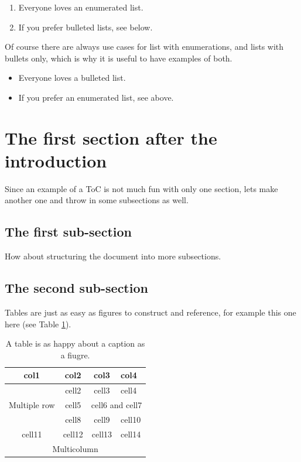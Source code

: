 \documentclass{smarthepnote}
\begin{document}
\begin{enumerate}
\item Everyone loves an enumerated list.
\item If you prefer bulleted lists, see below.
\end{enumerate}

Of course there are always use cases for list with enumerations, and lists with bullets only, which is why it is useful to have examples of both.

\begin{itemize}
    \item Everyone loves a bulleted list.
    \item If you prefer an enumerated list, see above.
\end{itemize}

\section{The first section after the introduction}
Since an example of a ToC is not much fun with only one section, lets make another one and throw in some subsections as well.


\subsection{The first sub-section}
How about structuring the document into more subsections.

\subsection{The second sub-section}
Tables are just as easy as figures to construct and reference, for example this one here (see Table \ref{tab:exampletable}).

\begin{table}[h]
\begin{center}
\begin{tabular}{ |c|c|c|p{}| } 
    \hline
    \rowcolor{lightgray} 
    col1 & col2 & col3 & col4\\
    \hline
    \multirow{3}{4em}{Multiple row} & cell2 & cell3 & cell4 \\ 
    \cline{3-4}
    & cell5 & \multicolumn{2}{c|}{cell6 and cell7} \\
    \cline{3-4}
    & cell8 & cell9 & cell10 \\ 
    \hline
    cell11 & cell12 & cell13 & cell14 \\ 
    \hline
    \multicolumn{4}{|c|}{ Multicolumn} \\
    \hline
\end{tabular}
\end{center}
\caption{A table is as happy about a caption as a fiugre.}
\label{tab:exampletable}
\end{table}
\end{document}
